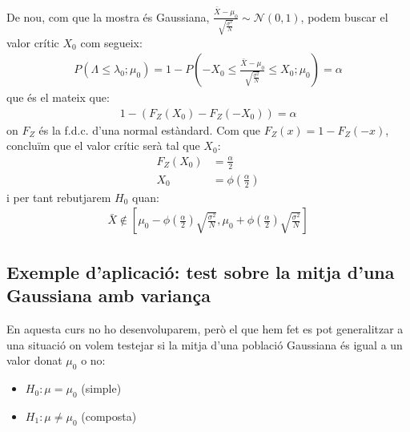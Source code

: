 \documentclass[letterpaper,10pt,english]{sphinxmanual}
\begin{document}
De nou, com que la mostra és Gaussiana, \(\frac{\bar{X} - \mu_0}{\sqrt{\frac{\sigma^2}{N}}} \sim \mathcal{N}(0, 1)\),
podem buscar el valor crític \(X_0\) com segueix:
\begin{equation*}
\begin{split}P(\Lambda \leq \lambda_0; \mu_0) = 1 - P(-X_0 \leq \frac{\bar{X} - \mu_0}{\sqrt{\frac{\sigma^2}{N}}} \leq X_0; \mu_0) = \alpha\end{split}
\end{equation*}
que és el mateix que:
\begin{equation*}
\begin{split}1 - (F_Z(X_0) - F_Z(-X_0)) = \alpha\end{split}
\end{equation*}
on \(F_Z\) és la f.d.c. d’una normal estàndard. Com que \(F_Z(x) = 1 - F_Z(-x)\),
concluïm que el valor crític serà tal que \(X_0\):
\begin{equation*}
\begin{split}F_Z(X_0) &= \frac{\alpha}{2} \\
X_0 &= \phi\left(\frac{\alpha}{2}\right)\end{split}
\end{equation*}
i per tant rebutjarem \(H_0\) quan:
\begin{equation*}
\begin{split}\bar{X} \not \in \left[\mu_0 - \phi\left(\frac{\alpha}{2}\right)\sqrt{\frac{\sigma^2}{N}}, \mu_0 + \phi\left(\frac{\alpha}{2}\right)\sqrt{\frac{\sigma^2}{N}}\right]\end{split}
\end{equation*}

\subsection{Exemple d’aplicació: test sobre la mitja d’una Gaussiana amb variança }
\label{\detokenize{0_Intro/0_4_Tests:exemple-d-aplicacio-test-sobre-la-mitja-d-una-gaussiana-amb-varianca-desconeguda}}
En aquesta curs no ho desenvoluparem, però el que hem fet es pot generalitzar
a una situació on volem testejar si la mitja d’una població Gaussiana és igual a
un valor donat \(\mu_0\) o no:
\begin{itemize}
\item {} 
\(H_0: \mu= \mu_0\) (simple)

\item {} 
\(H_1: \mu \neq \mu_0\) (composta)

\end{itemize}
\end{document}
